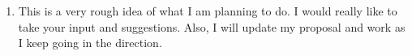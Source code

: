 \documentclass[11pt]{article}
\begin{document}
\begin{compactenum}
\begin{minipage}{\minpagw}
{{\begin{enumerate}
\begin{itemize}
            \item \textbf{Week 5 (April 18 - April 23) :} Wrapping up
            \item \textbf{Week 6 (April 24 - April 28) :} Project report and presentation.
        \end{itemize}
        \item This is a very rough idea of what I am planning to do. I would really like to take your input and suggestions. Also, I will update my proposal and work as I keep going in the direction. 
    \end{enumerate}
    }%
  }%
\end{minipage}  
  


\end{compactenum}
\end{document}
